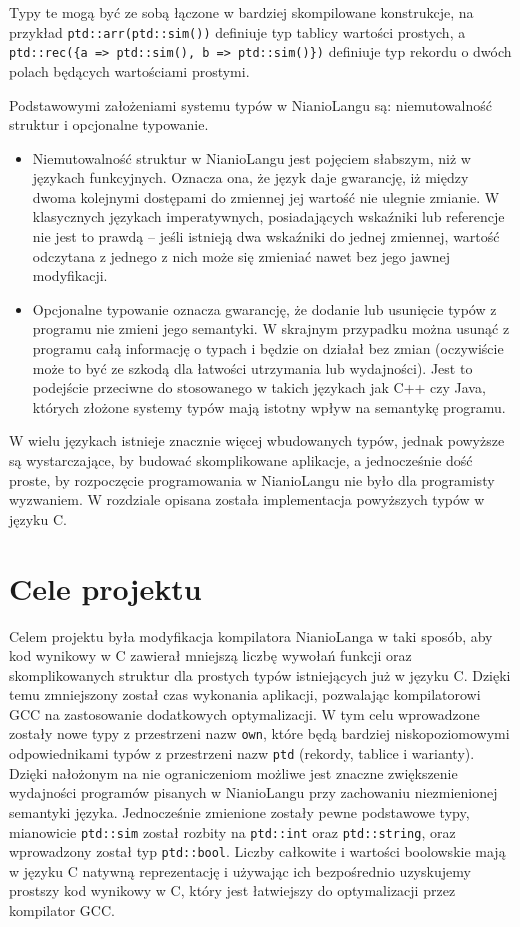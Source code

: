 \documentclass[licencjacka]{pracamgr}
\begin{document}
Typy te mogą być ze sobą łączone w bardziej skompilowane konstrukcje, na przykład \texttt{ptd::arr(ptd::sim())} definiuje
typ tablicy wartości prostych, a \texttt{ptd::rec(\{a => ptd::sim(), b => ptd::sim()\})} definiuje typ rekordu o dwóch polach będących wartościami
prostymi.

Podstawowymi założeniami systemu typów w NianioLangu są: niemutowalność struktur i opcjonalne typowanie.

\begin{itemize}
 \item Niemutowalność struktur w NianioLangu jest pojęciem słabszym, niż w językach funkcyjnych. Oznacza ona,
 że język daje gwarancję, iż między dwoma kolejnymi dostępami do zmiennej jej wartość nie ulegnie zmianie.
 W klasycznych językach imperatywnych, posiadających wskaźniki lub referencje nie jest to prawdą -- jeśli istnieją dwa wskaźniki
 do jednej zmiennej, wartość odczytana z jednego z nich może się zmieniać nawet bez jego jawnej modyfikacji.
 \item Opcjonalne typowanie oznacza gwarancję, że dodanie lub usunięcie typów z programu nie zmieni jego semantyki.
 W skrajnym przypadku można usunąć z programu całą informację o typach i będzie on działał bez zmian
 (oczywiście może to być ze szkodą dla łatwości utrzymania lub wydajności). Jest to podejście przeciwne do stosowanego
 w takich językach jak C++ czy Java, których złożone systemy typów mają istotny wpływ na semantykę programu.
\end{itemize}

W wielu językach istnieje znacznie więcej wbudowanych typów, jednak powyższe są wystarczające, by budować skomplikowane aplikacje,
a jednocześnie dość proste, by rozpoczęcie programowania w NianioLangu nie było dla programisty wyzwaniem.
W rozdziale \textit{} opisana została implementacja powyższych typów w języku C.

\section{Cele projektu}
Celem projektu była modyfikacja kompilatora NianioLanga w taki sposób, aby kod wynikowy w C zawierał mniejszą liczbę wywołań funkcji oraz
skomplikowanych
struktur dla prostych typów istniejących już w języku C.
Dzięki temu zmniejszony został czas wykonania aplikacji, pozwalając kompilatorowi GCC na zastosowanie dodatkowych optymalizacji.
W tym celu wprowadzone zostały nowe typy z przestrzeni nazw \texttt{own},
które będą bardziej niskopoziomowymi odpowiednikami typów z przestrzeni nazw \texttt{ptd} (rekordy, tablice i warianty).
Dzięki nałożonym na nie ograniczeniom możliwe jest znaczne zwiększenie wydajności programów pisanych w NianioLangu przy zachowaniu
niezmienionej semantyki języka.
Jednocześnie zmienione zostały pewne podstawowe typy, mianowicie \texttt{ptd::sim} został rozbity na
\texttt{ptd::int} oraz \texttt{ptd::string}, oraz wprowadzony został typ \texttt{ptd::bool}.
Liczby całkowite i wartości boolowskie mają w języku C natywną reprezentację i używając ich bezpośrednio
uzyskujemy prostszy kod wynikowy w C, który jest łatwiejszy do optymalizacji przez kompilator GCC.
\end{document}
